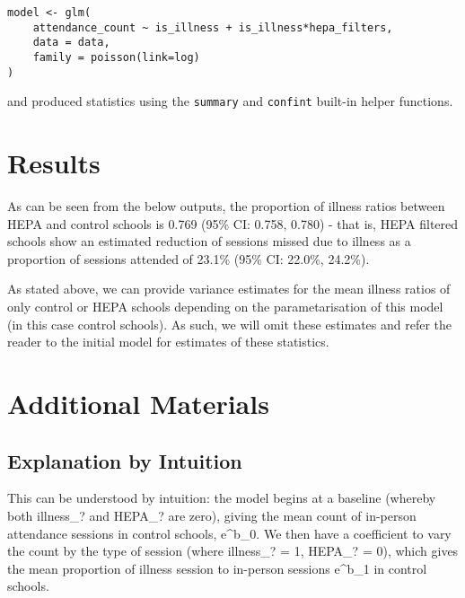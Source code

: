 \documentclass[11pt]{article}
\begin{document}
\begin{verbatim}
model <- glm(
    attendance_count ~ is_illness + is_illness*hepa_filters,
    data = data,
    family = poisson(link=log)
)
\end{verbatim}

and produced statistics using the \texttt{summary} and \texttt{confint}
built-in helper functions.

\hypertarget{results}{%
\section{Results}\label{results}}

As can be seen from the below outputs, the proportion of illness ratios
between HEPA and control schools is 0.769 (95\% CI: 0.758, 0.780) - that
is, HEPA filtered schools show an estimated reduction of sessions missed
due to illness as a proportion of sessions attended of 23.1\% (95\% CI:
22.0\%, 24.2\%).

As stated above, we can provide variance estimates for the mean illness
ratios of only control or HEPA schools depending on the parametarisation
of this model (in this case control schools). As such, we will omit
these estimates and refer the reader to the initial model for estimates
of these statistics.

\hypertarget{additional-materials}{%
\section{Additional Materials}\label{additional-materials}}

\hypertarget{explanation-by-intuition}{%
\subsection{Explanation by Intuition}\label{explanation-by-intuition}}

This can be understood by intuition: the model begins at a baseline
(whereby both illness\_? and HEPA\_? are zero), giving the mean count of
in-person attendance sessions in control schools, e\^{}b\_0. We then
have a coefficient to vary the count by the type of session (where
illness\_? = 1, HEPA\_? = 0), which gives the mean proportion of illness
session to in-person sessions e\^{}b\_1 in control schools.
\end{document}
